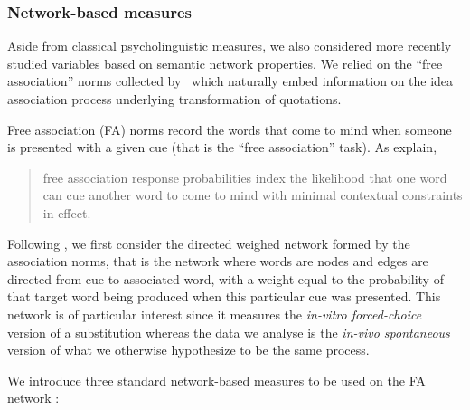 \subsubsection{Network-based measures}

Aside from classical psycholinguistic measures, we also considered more recently studied variables based on semantic network properties.
We relied on the ``free association'' norms collected by~\citet{Nelson04} which naturally embed information on the idea association process underlying transformation of quotations.

Free association (FA) norms record the words that come to mind when someone is presented with a given cue (that is the ``free association'' task).
As \citeauthor{Nelson04} explain,
\begin{quote}
free association response probabilities index the likelihood that one word can cue another word to come to mind with minimal contextual constraints in effect.~\citep{Nelson04}
\end{quote}
Following \citet{Griffiths07}, we first consider the directed weighed network formed by the association norms, that is the network where words are nodes and edges are directed from cue to associated word, with a weight equal to the probability of that target word being produced when this particular cue was presented.
This network is of particular interest since it measures the \emph{in-vitro forced-choice} version of a substitution whereas the data we analyse is the \emph{in-vivo spontaneous} version of what we otherwise hypothesize to be the same process.

\bigskip
We introduce three standard network-based measures to be used on the FA network :

